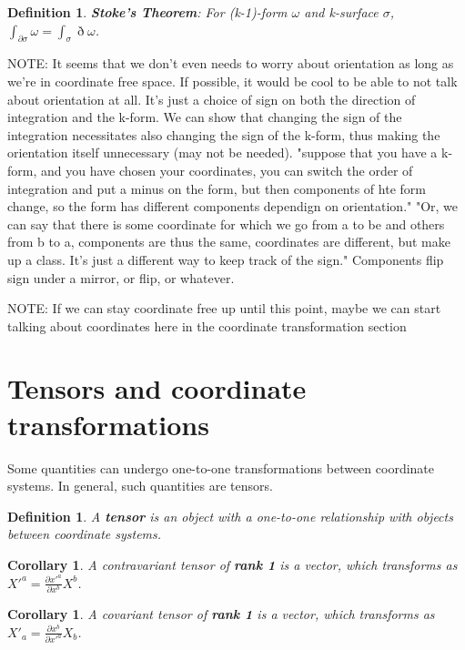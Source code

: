 \documentclass{book}
\newtheorem{defn}[equation]{Definition}
\newtheorem{coro}[equation]{Corollary}
\begin{document}
\begin{defn}
	\textbf{Stoke's Theorem}: For (k-1)-form $\omega$ and k-surface $\sigma$, $\int_{\partial \sigma}\omega = \int_{\sigma}\eth\omega$. 
\end{defn}

NOTE: It seems that we don't even needs to worry about orientation as long as we're in coordinate free space. If possible, it would be cool to be able to not talk about orientation at all. It's just a choice of sign on both the direction of integration and the k-form. We can show that changing the sign of the integration necessitates also changing the sign of the k-form, thus making the orientation itself unnecessary (may not be needed). "suppose that you have a k-form, and you have chosen your coordinates, you can switch the order of integration and put a minus on the form, but then components of hte form change, so the form has different components dependign on orientation." "Or, we can say that there is some coordinate for which we go from a to be and others from b to a, components are thus the same, coordinates are different, but make up a class. It's just a different way to keep track of the sign." Components flip sign under a mirror, or flip, or whatever. 

NOTE: If we can stay coordinate free up until this point, maybe we can start talking about coordinates here in the coordinate transformation section
\section{Tensors and coordinate transformations}
Some quantities can undergo one-to-one transformations between coordinate systems. In general, such quantities are tensors. 


\begin{defn}
	A \textbf{tensor} is an object with a one-to-one relationship with objects between coordinate systems. 
\end{defn}

\begin{coro}
	A contravariant tensor of \textbf{rank 1} is a vector, which transforms as  $X'^a = \frac{\partial x'^a}{\partial x^b} X^b$.  
\end{coro}

\begin{coro}
	A covariant tensor of \textbf{rank 1} is a vector, which transforms as $X'_a = \frac{\partial x^b}{\partial x'^a} X_b$. 
\end{coro}
\end{document}
